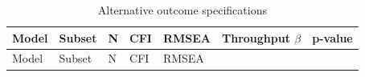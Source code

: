 \documentclass[
  number]{elsarticle}
\begin{document}
\begin{longtable}[]{@{}
  >{\raggedright\arraybackslash}p{}
  >{\raggedright\arraybackslash}p{}
  >{\raggedleft\arraybackslash}p{}
  >{\raggedleft\arraybackslash}p{}
  >{\raggedleft\arraybackslash}p{}
  >{\raggedleft\arraybackslash}p{}
  >{\raggedleft\arraybackslash}p{}@{}}
\caption{Alternative outcome
specifications}\label{tbl-alt-outcomes}\tabularnewline
\toprule\noalign{}
\begin{minipage}[b]{\linewidth}\raggedright
Model
\end{minipage} & \begin{minipage}[b]{\linewidth}\raggedright
Subset
\end{minipage} & \begin{minipage}[b]{\linewidth}\raggedleft
N
\end{minipage} & \begin{minipage}[b]{\linewidth}\raggedleft
CFI
\end{minipage} & \begin{minipage}[b]{\linewidth}\raggedleft
RMSEA
\end{minipage} & \begin{minipage}[b]{\linewidth}\raggedleft
Throughput \(\beta\)
\end{minipage} & \begin{minipage}[b]{\linewidth}\raggedleft
p-value
\end{minipage} \\
\midrule\noalign{}
\endfirsthead
\toprule\noalign{}
\begin{minipage}[b]{\linewidth}\raggedright
Model
\end{minipage} & \begin{minipage}[b]{\linewidth}\raggedright
Subset
\end{minipage} & \begin{minipage}[b]{\linewidth}\raggedleft
N
\end{minipage} & \begin{minipage}[b]{\linewidth}\raggedleft
CFI
\end{minipage} & \begin{minipage}[b]{\linewidth}\raggedleft
RMSEA
\end{minipage} & \begin{minipage}[b]{\linewidth}\raggedleft

\end{minipage}
\end{longtable}
\end{document}
